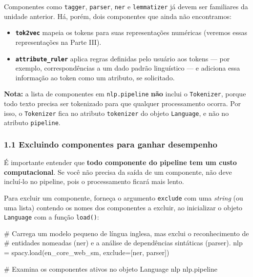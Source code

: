 \documentclass[
  brazilian,
  11pt,
]{article}
\newenvironment{Shaded}{\begin{snugshade}}{\end{snugshade}}
\newcommand{\CommentTok}[1]{\textcolor[rgb]{0.48,0.49,0.49}{#1}}
\newcommand{\NormalTok}[1]{\textcolor[rgb]{0.81,0.81,0.76}{#1}}
\newcommand{\OperatorTok}[1]{\textcolor[rgb]{0.81,0.81,0.76}{#1}}
\newcommand{\StringTok}[1]{\textcolor[rgb]{0.96,0.31,0.31}{#1}}
\providecommand{\tightlist}{%
  \setlength{\itemsep}{0pt}\setlength{\parskip}{0pt}}
\let\oldtexttt\texttt
\renewcommand{\texttt}[1]{{\color{inlink}\oldtexttt{#1}}}
\begin{document}
Componentes como \texttt{tagger}, \texttt{parser}, \texttt{ner} e
\texttt{lemmatizer} já devem ser familiares da unidade anterior. Há,
porém, dois componentes que ainda não encontramos:

\begin{itemize}
\tightlist
\item
  \textbf{\texttt{tok2vec}} mapeia os tokens para suas representações
  numéricas (veremos essas representações na Parte III).
\item
  \textbf{\texttt{attribute\_ruler}} aplica regras definidas pelo
  usuário aos tokens --- por exemplo, correspondências a um dado padrão
  linguístico --- e adiciona essa informação ao token como um atributo,
  se solicitado.
\end{itemize}

\begin{notebox}

\textbf{Nota:} a lista de componentes em \texttt{nlp.pipeline}
\textbf{não} inclui o \texttt{Tokenizer}, porque todo texto precisa ser
tokenizado para que qualquer processamento ocorra. Por isso, o
\texttt{Tokenizer} fica no atributo \texttt{tokenizer} do objeto
\texttt{Language}, e não no atributo \texttt{pipeline}.

\end{notebox}

\subsubsection{1.1 Excluindo componentes para ganhar
desempenho}\label{excluindo-componentes-para-ganhar-desempenho}

É importante entender que \textbf{todo componente do pipeline tem um
custo computacional}. Se você não precisa da saída de um componente, não
deve incluí‑lo no pipeline, pois o processamento ficará mais lento.

Para excluir um componente, forneça o argumento \texttt{exclude} com uma
\emph{string} (ou uma lista) contendo os nomes dos componentes a
excluir, ao inicializar o objeto \texttt{Language} com a função
\texttt{load()}:

\begin{Shaded}
\begin{Highlighting}[]
\CommentTok{\# Carrega um modelo pequeno de língua inglesa, mas exclui o reconhecimento de}
\CommentTok{\# entidades nomeadas (\textquotesingle{}ner\textquotesingle{}) e a análise de dependências sintáticas (\textquotesingle{}parser\textquotesingle{}).}
\NormalTok{nlp }\OperatorTok{=}\NormalTok{ spacy.load(}\StringTok{\textquotesingle{}en\_core\_web\_sm\textquotesingle{}}\NormalTok{, exclude}\OperatorTok{=}\NormalTok{[}\StringTok{\textquotesingle{}ner\textquotesingle{}}\NormalTok{, }\StringTok{\textquotesingle{}parser\textquotesingle{}}\NormalTok{])}

\CommentTok{\# Examina os componentes ativos no objeto Language \textquotesingle{}nlp\textquotesingle{}}
\NormalTok{nlp.pipeline}
\end{Highlighting}
\end{Shaded}
\end{document}
